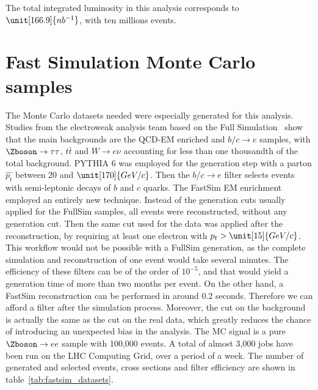      The total integrated luminosity in this analysis corresponds to $\unit[166.9]{nb^{-1}}$, with ten millions events.

     \section{Fast Simulation Monte Carlo samples}
     The Monte Carlo datasets needed were especially generated for this analysis. Studies from the electroweak analysis team based on the Full Simulation~\cite{ewk:cms.pas.wz.xs} show that the main backgrounds are the QCD-EM enriched and $b/c\rightarrow e$ samples, with $\Zboson\rightarrow \tau\tau$, $t\bar t$ and $W\rightarrow e\nu$ accounting for less than one thousandth of the total background.
     PYTHIA 6 was employed for the generation step with a parton $\hat{p_t}$ between $20$ and $\unit[170]{GeV/c}$. Then the $b/c\rightarrow e$ filter selects events with semi-leptonic decays of $b$ and $c$ quarks. The FastSim EM enrichment employed an entirely new technique. Instead of the generation cuts usually applied for the FullSim samples, all events were reconstructed, without any generation cut. Then the same cut used for the data was applied after the reconstruction, by requiring at least one electron with $p_t > \unit[15]{GeV/c}$. This workflow would not be possible with a FullSim generation, as the complete simulation and reconstruction of one event would take several minutes. The efficiency of these filters can be of the order of $10^{-5}$, and that would yield a generation time of more than two months per event. On the other hand, a FastSim reconstruction can be performed in around 0.2 seconds. Therefore we can afford a filter after the simulation process. Moreover, the cut on the background is actually the same as the cut on the real data, which greatly reduces the chance of introducing an unexpected bias in the analysis. The MC signal is a pure $\Zboson\rightarrow ee$ sample with 100,000 events. A total of almost 3,000 jobs have been run on the LHC Computing Grid, over a period of a week. The number of generated and selected events, cross sections and filter efficiency are shown in table~\ref{tab:fastsim_datasets}.
     \begin{table}[hbp]
         
     \end{table}

